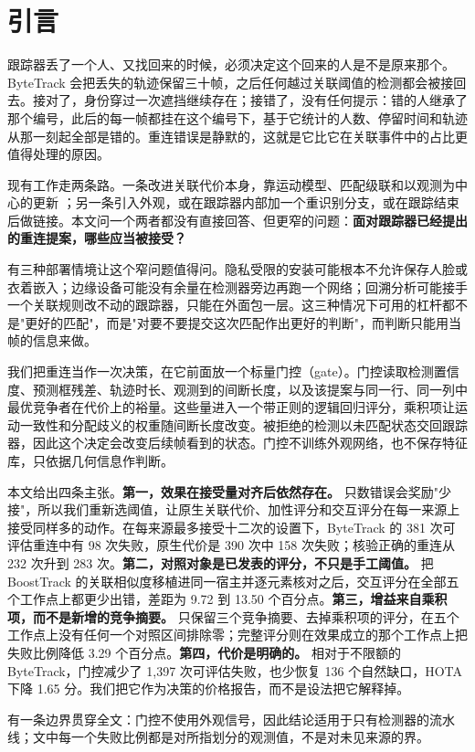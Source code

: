 \section{引言}

跟踪器丢了一个人、又找回来的时候，必须决定这个回来的人是不是原来那个。ByteTrack
\cite{zhang2022bytetrack} 会把丢失的轨迹保留三十帧，之后任何越过关联阈值的检测都会被接回去。接对了，身份穿过一次遮挡继续存在；接错了，没有任何提示：错的人继承了那个编号，此后的每一帧都挂在这个编号下，基于它统计的人数、停留时间和轨迹从那一刻起全部是错的。重连错误是静默的，这就是它比它在关联事件中的占比更值得处理的原因。

现有工作走两条路。一条改进关联代价本身，靠运动模型、匹配级联和以观测为中心的更新
\cite{zhang2022bytetrack,aharon2022botsort,cao2023ocsort}；另一条引入外观，或在跟踪器内部加一个重识别分支，或在跟踪结束后做链接。本文问一个两者都没有直接回答、但更窄的问题：\textbf{面对跟踪器已经提出的重连提案，哪些应当被接受？}

有三种部署情境让这个窄问题值得问。隐私受限的安装可能根本不允许保存人脸或衣着嵌入；边缘设备可能没有余量在检测器旁边再跑一个网络；回溯分析可能接手一个关联规则改不动的跟踪器，只能在外面包一层。这三种情况下可用的杠杆都不是"更好的匹配"，而是"对要不要提交这次匹配作出更好的判断"，而判断只能用当帧的信息来做。

我们把重连当作一次决策，在它前面放一个标量门控（gate）。门控读取检测置信度、预测框残差、轨迹时长、观测到的间断长度，以及该提案与同一行、同一列中最优竞争者在代价上的裕量。这些量进入一个带正则的逻辑回归评分，乘积项让运动一致性和分配歧义的权重随间断长度改变。被拒绝的检测以未匹配状态交回跟踪器，因此这个决定会改变后续帧看到的状态。门控不训练外观网络，也不保存特征库，只依据几何信息作判断。

本文给出四条主张。\textbf{第一，效果在接受量对齐后依然存在。} 只数错误会奖励"少接"，所以我们重新选阈值，让原生关联代价、加性评分和交互评分在每一来源上接受同样多的动作。在每来源最多接受十二次的设置下，ByteTrack 的 381 次可评估重连中有 98 次失败，原生代价是 390 次中 158 次失败；核验正确的重连从 232 次升到 283 次。\textbf{第二，对照对象是已发表的评分，不只是手工阈值。} 把 BoostTrack 的关联相似度移植进同一宿主并逐元素核对之后，交互评分在全部五个工作点上都更少出错，差距为 9.72 到 13.50 个百分点。\textbf{第三，增益来自乘积项，而不是新增的竞争摘要。} 只保留三个竞争摘要、去掉乘积项的评分，在五个工作点上没有任何一个对照区间排除零；完整评分则在效果成立的那个工作点上把失败比例降低 3.29 个百分点。\textbf{第四，代价是明确的。} 相对于不限额的 ByteTrack，门控减少了 1,397 次可评估失败，也少恢复 136 个自然缺口，HOTA 下降 1.65 分。我们把它作为决策的价格报告，而不是设法把它解释掉。

有一条边界贯穿全文：门控不使用外观信号，因此结论适用于只有检测器的流水线；文中每一个失败比例都是对所指划分的观测值，不是对未见来源的界。
